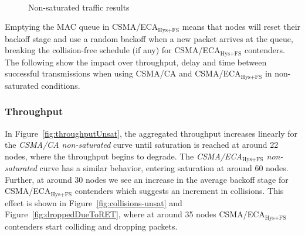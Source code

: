 \begin{figure}[tb]
		\\
		\caption{Non-saturated traffic results}
		\label{fig:unsatTest}
	\end{figure}

	
	Emptying the MAC queue in CSMA/ECA$_{\text{Hys+FS}}$ means that nodes will reset their backoff stage and use a random backoff when a new packet arrives at the queue, breaking the collision-free schedule (if any) for CSMA/ECA$_{\text{Hys+FS}}$ contenders. The following show the impact over throughput, delay and time between successful transmissions when using CSMA/CA and CSMA/ECA$_{\text{Hys+FS}}$ in non-saturated conditions.\\
	
	\subsubsection{Throughput}
	
	
	In Figure~\ref{fig:throughputUnsat}, the aggregated throughput increases linearly for the \emph{CSMA/CA non-saturated} curve until saturation is reached at around 22 nodes, where the throughput begins to degrade. The \emph{CSMA/ECA$_{\text{Hys+FS}}$ non-saturated} curve has a similar behavior, entering saturation at around 60 nodes. Further, at around 30 nodes we see an increase in the average backoff stage for CSMA/ECA$_{\text{Hys+FS}}$ contenders which suggests an increment in collisions. This effect is shown in Figure~\ref{fig:collisions-unsat} and Figure~\ref{fig:droppedDueToRET}, where at around 35 nodes CSMA/ECA$_{\text{Hys+FS}}$ contenders start colliding and dropping packets. 
	

